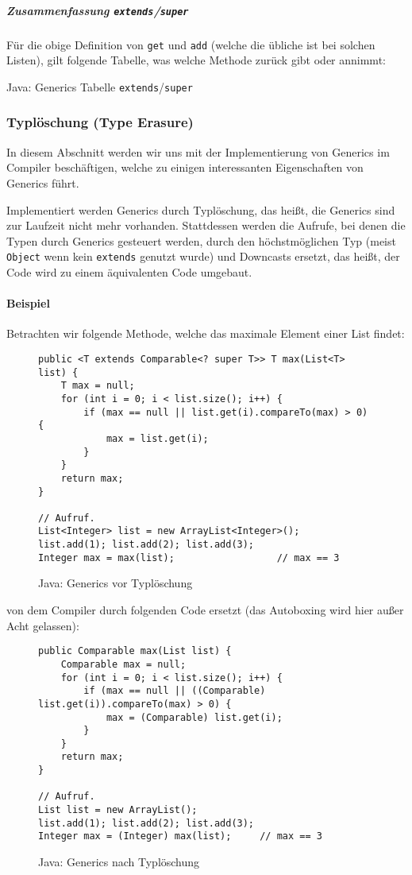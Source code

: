 			\subparagraph{Zusammenfassung \texttt{extends}/\texttt{super}}
				Für die obige Definition von \texttt{get} und \texttt{add} (welche die übliche ist bei solchen Listen), gilt folgende Tabelle, was welche Methode zurück gibt oder annimmt:
				\begin{table}[H]
					\centering
					\caption{Java: Generics Tabelle \texttt{extends}/\texttt{super}}
				\end{table}
	
	\subsubsection{Typlöschung (Type Erasure)}
		In diesem Abschnitt werden wir uns mit der Implementierung von Generics im Compiler beschäftigen, welche zu einigen interessanten Eigenschaften von Generics führt.
		
		Implementiert werden Generics durch Typlöschung, das heißt, die Generics sind zur Laufzeit nicht mehr vorhanden. Stattdessen werden die Aufrufe, bei denen die Typen durch Generics gesteuert werden, durch den höchstmöglichen Typ (meist \texttt{Object} wenn kein \texttt{extends} genutzt wurde) und Downcasts ersetzt, das heißt, der Code wird zu einem äquivalenten Code umgebaut.
		
		\paragraph{Beispiel}
			Betrachten wir folgende Methode, welche das maximale Element einer List findet:
			\begin{figure}[H]
				\centering
				\begin{lstlisting}[style = base]
public <T extends Comparable<? super T>> T max(List<T> list) {
	T max = null;
	for (int i = 0; i < list.size(); i++) {
		if (max == null || list.get(i).compareTo(max) > 0) {
			max = list.get(i);
		}
	}
	return max;
}

// Aufruf.
List<Integer> list = new ArrayList<Integer>();
list.add(1); list.add(2); list.add(3);
Integer max = max(list);                  // max == 3
				\end{lstlisting}
				\caption{Java: Generics vor Typlöschung}
			\end{figure}
			von dem Compiler durch folgenden Code ersetzt (das Autoboxing wird hier außer Acht gelassen):
			\begin{figure}[H]
				\centering
				\begin{lstlisting}[style = base]
public Comparable max(List list) {
	Comparable max = null;
	for (int i = 0; i < list.size(); i++) {
		if (max == null || ((Comparable) list.get(i)).compareTo(max) > 0) {
			max = (Comparable) list.get(i);
		}
	}
	return max;
}

// Aufruf.
List list = new ArrayList();
list.add(1); list.add(2); list.add(3);
Integer max = (Integer) max(list);     // max == 3
				\end{lstlisting}
				\caption{Java: Generics nach Typlöschung}
			\end{figure}
	

